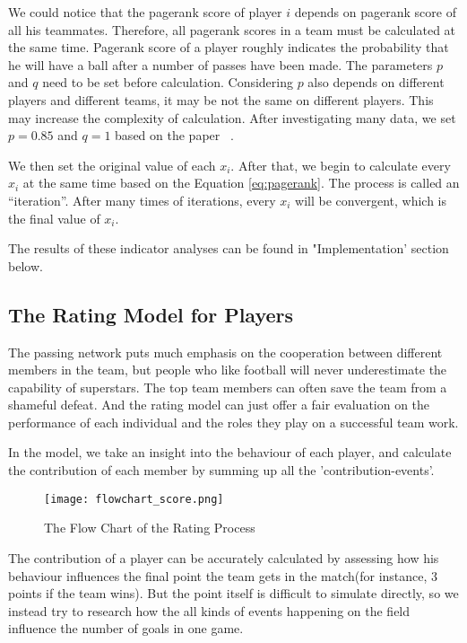 \documentclass[12pt]{mcmthesis}
\begin{document}
	We could notice that the pagerank score of player $i$ depends on pagerank score of all his teammates. Therefore, all pagerank scores in a team must be calculated at the same time. Pagerank score of a player roughly indicates the probability that he will have a ball after a number of passes have been made. The parameters $p$ and $q$ need to be set before calculation. Considering $p$ also depends on different players and different teams, it may be not the same on different players. This may increase the complexity of calculation. After investigating many data, we set $p = 0.85$ and $q = 1$ based on the paper ~\cite{pena2012network}.
	
	We then set the original value of each $x_i$. After that, we begin to calculate every $x_i$ at the same time based on the Equation \ref{eq:pagerank}. The process is called an  ``iteration''. After many times of iterations, every $x_i$ will be convergent, which is the final value of $x_i$.
   
   The results of these indicator analyses can be found in "Implementation' section below.

\subsection{The Rating Model for Players}
The passing network puts much emphasis on the cooperation between different members in the team, but people who like football will never underestimate the capability of superstars. The top team members can often save the team from a shameful defeat. And the rating model can just offer a fair evaluation on the performance of each individual and the roles they play on a successful team work.

In the model, we take an insight into the behaviour of each player, and calculate the contribution of each member by summing up all the 'contribution-events'.

\begin{figure}[h]
	\centering
	\texttt{[image: flowchart\_score.png]}
	\caption{The Flow Chart of the Rating Process}
	\label{fig:flow_score}
\end{figure}

The contribution of a player can be accurately calculated by assessing how his behaviour influences the final point the team gets in the match(for instance, 3 points if the team wins). But the point itself is difficult to simulate directly, so we instead try to research how the all kinds of events happening on the field influence the number of goals in one game.
\end{document}
